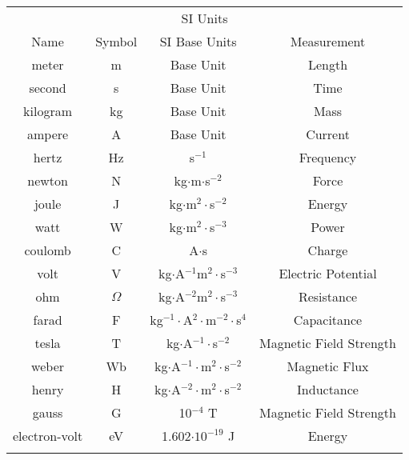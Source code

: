 	\begin{tabular}{c c c c}
 	\multicolumn{4}{c}{SI Units} \\
	Name & Symbol & SI Base Units & Measurement \\ \hline \hline \noalign{\smallskip}
	meter & m & Base Unit & Length \\[3pt] \hline  \noalign{\smallskip}
	second & s & Base Unit & Time \\[3pt] \hline  \noalign{\smallskip}
	kilogram & kg & Base Unit & Mass \\[3pt] \hline  \noalign{\smallskip}
	ampere & A & Base Unit & Current \\[3pt] \hline  \noalign{\smallskip}
	hertz & Hz & s$^{-1}$ & Frequency \\[3pt] \hline  \noalign{\smallskip}
	newton & N & kg$\cdot$m$\cdot$s$^{-2}$& Force\\[3pt] \hline  \noalign{\smallskip}
	joule & J & kg$\cdot$m$^2\cdot$s$^{-2}$& Energy \\[3pt] \hline  \noalign{\smallskip}
	watt & W & kg$\cdot$m$^2\cdot$s$^{-3}$& Power \\[3pt] \hline  \noalign{\smallskip}
	coulomb & C & A$\cdot$s&Charge \\[3pt] \hline  \noalign{\smallskip}
	volt & V & kg$\cdot$A$^{-1}$m$^2\cdot$s$^{-3}$ & Electric Potential\\[3pt] \hline  \noalign{\smallskip}
	ohm & $\Omega$ & kg$\cdot$A$^{-2}$m$^2\cdot$s$^{-3}$ & Resistance\\[3pt] \hline  \noalign{\smallskip}
	farad & F & kg$^{-1}\cdot$A$^2\cdot$m$^{-2}\cdot$s$^4$ & Capacitance \\[3pt] \hline  \noalign{\smallskip}
	tesla & T & kg$\cdot$A$^{-1}\cdot$s$^{-2}$ & Magnetic Field Strength\\[3pt] \hline  \noalign{\smallskip}
	weber & Wb & kg$\cdot$A$^{-1}\cdot$m$^2\cdot$s$^{-2}$& Magnetic Flux \\[3pt] \hline  \noalign{\smallskip}
	henry & H & kg$\cdot$A$^{-2}\cdot$m$^2\cdot$s$^{-2}$& Inductance \\[3pt] \hline  \noalign{\smallskip}
	gauss & G & 10$^{-4}$ T& Magnetic Field Strength \\[3pt] \hline  \noalign{\smallskip}
	electron-volt & eV & 1.602$\cdot 10^{-19}$ J& Energy \\[3pt] \hline \hline \noalign{\smallskip}
	\end{tabular}
\pagebreak